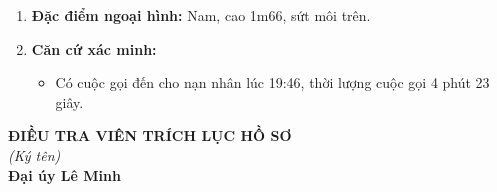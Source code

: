 \documentclass[12pt,a4paper]{article}
\begin{document}
\begin{enumerate}[label=\arabic*., leftmargin=*, itemsep=2pt, topsep=2pt, parsep=0pt]
  \item \textbf{Đặc điểm ngoại hình:} Nam, cao 1m66, sứt môi trên.
  \item \textbf{Căn cứ xác minh:}
\begin{itemize}[leftmargin=*, itemsep=2pt, topsep=2pt, parsep=0pt]
  \item Có cuộc gọi đến cho nạn nhân lúc 19:46, thời lượng cuộc gọi 4 phút 23 giây.
\end{itemize}
\end{enumerate}
\vspace{0.8cm}
\noindent
\hfill
\begin{minipage}[t]{0.50\textwidth}
    \begin{center}
        \textbf{ĐIỀU TRA VIÊN TRÍCH LỤC HỒ SƠ}\\[0.1cm]
        \textit{(Ký tên)}\\[1.6cm]
        \textbf{Đại úy Lê Minh}
    \end{center}
\end{minipage}
\end{document}
